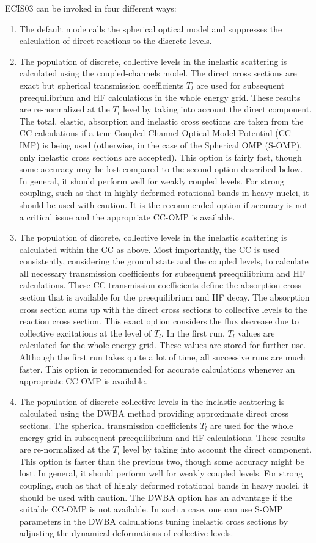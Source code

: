 \documentclass[twocolumn,amsmath,amssymb,10pt,groupedaddress,letter]{revtex4}
\begin{document}
ECIS03 can be invoked in four different ways:
\begin{enumerate}
\item The default mode calls the spherical optical model and
suppresses the calculation of direct
reactions to the discrete levels.
\item The population of discrete, collective levels in the inelastic scattering
is calculated using the coupled-channels model. The direct cross sections
are exact but spherical transmission coefficients $T_{l}$ are used
for subsequent preequilibrium and HF calculations in the whole energy
grid. These results are re-normalized at the $T_{l}$ level by taking
into account the direct component. The total, elastic, absorption and
inelastic cross sections are taken from the CC calculations if
a true Coupled-Channel Optical Model Potential (CC-IMP) is being used
(otherwise, in the case of the Spherical OMP (S-OMP), only inelastic
cross sections are accepted). This option is fairly fast, though some
accuracy may be lost compared to the second option described below.
In general, it should perform well for weakly coupled levels.
For strong coupling, such as that in highly deformed rotational bands
in heavy nuclei, it should be used with caution. It is the recommended
option if accuracy is not a critical issue and the appropriate CC-OMP
is available.
\item The population of discrete, collective levels in the inelastic scattering
is calculated within the CC as above. Most importantly, the CC is used
consistently, considering the ground state and the coupled levels,
to calculate all necessary transmission coefficients for subsequent
preequilibrium and HF calculations. These CC transmission coefficients
define the absorption cross section that is available for the preequilibrium
and HF decay. The absorption cross section sums up with the direct
cross sections to collective levels to the reaction cross section.
This exact option considers the flux decrease due to collective excitations
at the level of $T_{l}$. In the first run, $T_{l}$ values are calculated
for the whole energy grid. These values are stored for further use.
Although the first run takes quite a lot of time, all successive runs
are much faster. This option is recommended for accurate calculations
whenever an appropriate CC-OMP is available.
\item The population of discrete collective levels in the inelastic scattering
is calculated using the DWBA method providing approximate direct cross
sections. The spherical transmission coefficients $T_{l}$ are used
for the whole energy grid in subsequent preequilibrium and HF calculations.
These results are re-normalized at the $T_{l}$ level by taking into
account the direct component. This option is faster than the previous
two, though some accuracy might be lost. In general, it should perform
well for weakly coupled levels. For strong coupling, such as that of
highly deformed rotational bands in heavy nuclei, it should be
used with caution. The DWBA option has an advantage if the suitable
CC-OMP is not available. In such a case, one can use S-OMP parameters
in the DWBA calculations tuning inelastic cross sections by adjusting
the dynamical deformations of collective levels.
\end{enumerate}
\end{document}
